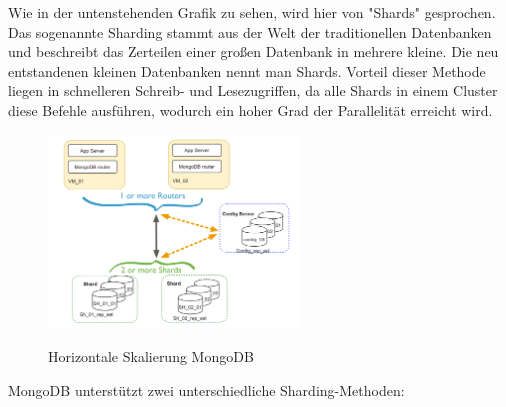 Wie in der untenstehenden Grafik zu sehen, wird hier von "Shards" gesprochen. Das sogenannte Sharding stammt aus der Welt der traditionellen Datenbanken und beschreibt das Zerteilen einer großen Datenbank in mehrere kleine. Die neu entstandenen kleinen Datenbanken nennt man Shards. Vorteil dieser Methode liegen in schnelleren Schreib- und Lesezugriffen, da alle Shards in einem Cluster diese Befehle ausführen, wodurch ein hoher Grad der Parallelität erreicht wird.
\begin{figure}[h!]
    \centering
    \includegraphics[width=0.6\textwidth]{pics/vertical_scaling_mongodb.png}
    \caption{Horizontale Skalierung MongoDB}
    \cite{vertical_scaling_mongodb}
    \label{fig:enter-label}
\end{figure}
\newline
MongoDB unterstützt zwei unterschiedliche Sharding-Methoden:
